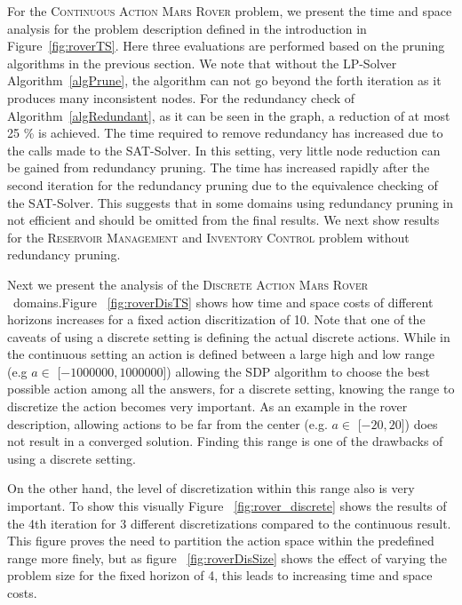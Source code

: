 \documentclass[twoside,11pt]{article}
\newcommand{\MarsRover}{\textsc{Mars Rover }}
\newcommand{\InventoryControl}{\textsc{Inventory Control }}
\newcommand{\WaterReservoir}{\textsc{Reservoir Management }}
\begin{document}
For the \textsc{Continuous Action} \MarsRover problem, we present the time and space analysis for the problem description defined in the introduction in Figure~\ref{fig:roverTS}. Here three evaluations are performed based on the pruning algorithms in the previous section. We note that without the LP-Solver Algorithm~\ref{algPrune}, the algorithm can not go beyond the forth iteration as it produces many inconsistent nodes. For the redundancy check of Algorithm~\ref{algRedundant}, as it can be seen in the graph, a reduction of at most 25 \% is achieved. The time required to remove redundancy has increased due to the calls made to the SAT-Solver.  In this setting, very little node reduction can be gained from redundancy pruning. The time has increased rapidly after the second iteration for the redundancy pruning due to the equivalence checking of the SAT-Solver. This suggests that in some domains using redundancy pruning in not efficient and should be omitted from the final results. We next show results for the  \WaterReservoir and \InventoryControl problem without redundancy pruning. 

Next we present the analysis of the \textsc{Discrete Action} \MarsRover\ domains.Figure ~\ref{fig:roverDisTS} shows how time and space costs of different horizons increases for a fixed action discritization of 10.
Note that one of the caveats of using a discrete setting is defining the actual discrete actions. While in the continuous setting an action is defined between a large high and low range (e.g $a \in$ [$-1000000,1000000$]) allowing the SDP algorithm to choose the best possible action among all the answers, for a discrete setting, knowing the range to discretize the action becomes very important. As an example in the rover description, allowing actions to be far from the center (e.g. $a \in$ [$-20,20$]) does not result in a converged solution. Finding this range is one of the drawbacks of using a discrete setting. 

On the other hand, the level of discretization within this range also is very important. To show this visually Figure ~\ref{fig:rover_discrete} shows the results of the 4th iteration for 3 different discretizations compared to the continuous result. This figure proves the need to partition the action space within the predefined range more finely, but as figure ~\ref{fig:roverDisSize} shows  the effect of varying the  problem size for the fixed horizon of 4, this leads to increasing time and space costs. 
\end{document}
